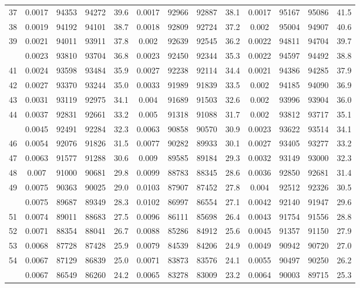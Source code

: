 \documentclass[
  14pt,
]{article}
\begin{document}
\begin{longtable}[t]{lcccccccccccc}
37 & 0.0017 & 94353 & 94272 & 39.6 & 0.0017 & 92966 & 92887 & 38.1 & 0.0017 & 95167 & 95086 & 41.5\\
38 & 0.0019 & 94192 & 94101 & 38.7 & 0.0018 & 92809 & 92724 & 37.2 & 0.002 & 95004 & 94907 & 40.6\\
39 & 0.0021 & 94011 & 93911 & 37.8 & 0.002 & 92639 & 92545 & 36.2 & 0.0022 & 94811 & 94704 & 39.7\\
\addlinespace
40 & 0.0023 & 93810 & 93704 & 36.8 & 0.0023 & 92450 & 92344 & 35.3 & 0.0022 & 94597 & 94492 & 38.8\\
41 & 0.0024 & 93598 & 93484 & 35.9 & 0.0027 & 92238 & 92114 & 34.4 & 0.0021 & 94386 & 94285 & 37.9\\
42 & 0.0027 & 93370 & 93244 & 35.0 & 0.0033 & 91989 & 91839 & 33.5 & 0.002 & 94185 & 94090 & 36.9\\
43 & 0.0031 & 93119 & 92975 & 34.1 & 0.004 & 91689 & 91503 & 32.6 & 0.002 & 93996 & 93904 & 36.0\\
44 & 0.0037 & 92831 & 92661 & 33.2 & 0.005 & 91318 & 91088 & 31.7 & 0.002 & 93812 & 93717 & 35.1\\
\addlinespace
45 & 0.0045 & 92491 & 92284 & 32.3 & 0.0063 & 90858 & 90570 & 30.9 & 0.0023 & 93622 & 93514 & 34.1\\
46 & 0.0054 & 92076 & 91826 & 31.5 & 0.0077 & 90282 & 89933 & 30.1 & 0.0027 & 93405 & 93277 & 33.2\\
47 & 0.0063 & 91577 & 91288 & 30.6 & 0.009 & 89585 & 89184 & 29.3 & 0.0032 & 93149 & 93000 & 32.3\\
48 & 0.007 & 91000 & 90681 & 29.8 & 0.0099 & 88783 & 88345 & 28.6 & 0.0036 & 92850 & 92681 & 31.4\\
49 & 0.0075 & 90363 & 90025 & 29.0 & 0.0103 & 87907 & 87452 & 27.8 & 0.004 & 92512 & 92326 & 30.5\\
\addlinespace
50 & 0.0075 & 89687 & 89349 & 28.3 & 0.0102 & 86997 & 86554 & 27.1 & 0.0042 & 92140 & 91947 & 29.6\\
51 & 0.0074 & 89011 & 88683 & 27.5 & 0.0096 & 86111 & 85698 & 26.4 & 0.0043 & 91754 & 91556 & 28.8\\
52 & 0.0071 & 88354 & 88041 & 26.7 & 0.0088 & 85286 & 84912 & 25.6 & 0.0045 & 91357 & 91150 & 27.9\\
53 & 0.0068 & 87728 & 87428 & 25.9 & 0.0079 & 84539 & 84206 & 24.9 & 0.0049 & 90942 & 90720 & 27.0\\
54 & 0.0067 & 87129 & 86839 & 25.0 & 0.0071 & 83873 & 83576 & 24.1 & 0.0055 & 90497 & 90250 & 26.2\\
\addlinespace
55 & 0.0067 & 86549 & 86260 & 24.2 & 0.0065 & 83278 & 83009 & 23.2 & 0.0064 & 90003 & 89715 & 25.3\\

\end{longtable}
\end{document}
